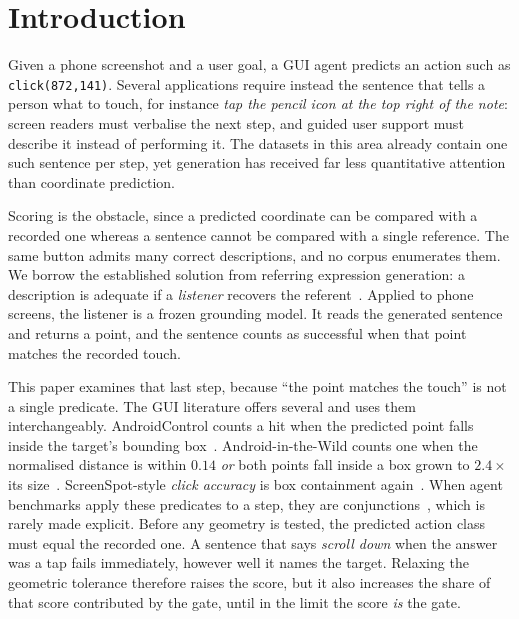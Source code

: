 \documentclass[runningheads,a4paper]{llncs}
\begin{document}
\section{Introduction}
\label{sec:intro}

Given a phone screenshot and a user goal, a GUI agent predicts an action such as
\texttt{click(872,141)}. Several applications require instead the sentence that tells a person
what to touch, for instance \emph{tap the pencil icon at the top right of the note}: screen
readers must verbalise the next step, and guided user support must describe it instead of
performing it. The datasets in this area already contain one such sentence per step, yet generation
has received far less quantitative attention than coordinate prediction.

Scoring is the obstacle, since a predicted coordinate can be compared with a recorded one
whereas a sentence cannot be compared with a single reference. The same button admits many
correct descriptions, and no corpus enumerates them. We borrow the established solution from referring
expression generation: a description is adequate if a \emph{listener} recovers the
referent~\cite{mao2016,luo2017,yu2016}. Applied to phone screens, the listener is a frozen
grounding model. It reads the generated sentence and returns a point, and the sentence counts as
successful when that point matches the recorded touch.

This paper examines that last step, because ``the point matches the touch'' is not a single
predicate. The GUI literature offers several and uses them interchangeably. AndroidControl counts
a hit when the predicted point falls inside the target's bounding box~\cite{androidcontrol}.
Android-in-the-Wild counts one when the normalised distance is within $0.14$ \emph{or} both points
fall inside a box grown to $2.4\times$ its size~\cite{aitw}. ScreenSpot-style \emph{click accuracy} is
box containment again~\cite{seeclick}. When agent benchmarks apply these predicates to a step, they
are conjunctions~\cite{osatlas}, which is rarely made explicit. Before any geometry is tested, the predicted action class must equal the recorded one. A
sentence that says \emph{scroll down} when the answer was a tap fails immediately, however well it
names the target. Relaxing the geometric tolerance therefore raises the
score, but it also increases the share of that score contributed by the gate, until in the limit
the score \emph{is} the gate.
\end{document}
